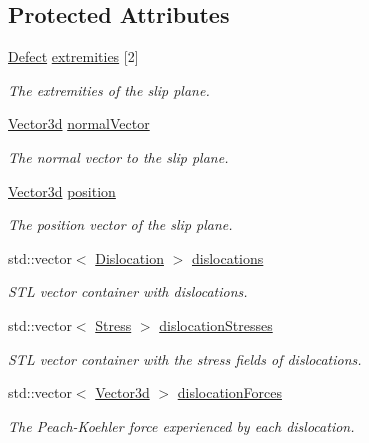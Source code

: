\subsection*{Protected Attributes}
\begin{DoxyCompactItemize}
\item 
\hyperlink{classDefect}{Defect} \hyperlink{classSlipPlane_abbdbe6ed805faf3777b54ff55a9c089c}{extremities} \mbox{[}2\mbox{]}
\begin{DoxyCompactList}\small\item\em The extremities of the slip plane. \end{DoxyCompactList}\item 
\hyperlink{classVector3d}{Vector3d} \hyperlink{classSlipPlane_aad33ce7b595e5fc55aefe51c7b0957f2}{normal\-Vector}
\begin{DoxyCompactList}\small\item\em The normal vector to the slip plane. \end{DoxyCompactList}\item 
\hyperlink{classVector3d}{Vector3d} \hyperlink{classSlipPlane_ac2ac59e22e9638a990c9e45aaa096d9a}{position}
\begin{DoxyCompactList}\small\item\em The position vector of the slip plane. \end{DoxyCompactList}\item 
std\-::vector$<$ \hyperlink{classDislocation}{Dislocation} $>$ \hyperlink{classSlipPlane_ad92c7c409f7e161db449528389180910}{dislocations}
\begin{DoxyCompactList}\small\item\em S\-T\-L vector container with dislocations. \end{DoxyCompactList}\item 
std\-::vector$<$ \hyperlink{classStress}{Stress} $>$ \hyperlink{classSlipPlane_adaa1bb736c2912f5e06e7aa4553c1ebd}{dislocation\-Stresses}
\begin{DoxyCompactList}\small\item\em S\-T\-L vector container with the stress fields of dislocations. \end{DoxyCompactList}\item 
std\-::vector$<$ \hyperlink{classVector3d}{Vector3d} $>$ \hyperlink{classSlipPlane_a2a74ae1f66a59e53a3ca0c9b81b28f7d}{dislocation\-Forces}
\begin{DoxyCompactList}\small\item\em The Peach-\/\-Koehler force experienced by each dislocation. \end{DoxyCompactList}\item 

\end{DoxyCompactItemize}
